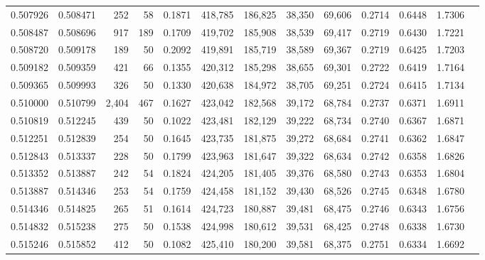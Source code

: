 \begin{tabular}{rrrrrrrrrrrrr}
0.507926 & 0.508471 &   252 &  58 &                                     0.1871 & 418,785 & 186,825 &  38,350 &  69,606 & 0.2714 & 0.6448 & 1.7306 \\
0.508487 & 0.508696 &   917 & 189 &                                     0.1709 & 419,702 & 185,908 &  38,539 &  69,417 & 0.2719 & 0.6430 & 1.7221 \\
0.508720 & 0.509178 &   189 &  50 &                                     0.2092 & 419,891 & 185,719 &  38,589 &  69,367 & 0.2719 & 0.6425 & 1.7203 \\
0.509182 & 0.509359 &   421 &  66 &                                     0.1355 & 420,312 & 185,298 &  38,655 &  69,301 & 0.2722 & 0.6419 & 1.7164 \\
0.509365 & 0.509993 &   326 &  50 &                                     0.1330 & 420,638 & 184,972 &  38,705 &  69,251 & 0.2724 & 0.6415 & 1.7134 \\
0.510000 & 0.510799 & 2,404 & 467 &                                     0.1627 & 423,042 & 182,568 &  39,172 &  68,784 & 0.2737 & 0.6371 & 1.6911 \\
0.510819 & 0.512245 &   439 &  50 &                                     0.1022 & 423,481 & 182,129 &  39,222 &  68,734 & 0.2740 & 0.6367 & 1.6871 \\
0.512251 & 0.512839 &   254 &  50 &                                     0.1645 & 423,735 & 181,875 &  39,272 &  68,684 & 0.2741 & 0.6362 & 1.6847 \\
0.512843 & 0.513337 &   228 &  50 &                                     0.1799 & 423,963 & 181,647 &  39,322 &  68,634 & 0.2742 & 0.6358 & 1.6826 \\
0.513352 & 0.513887 &   242 &  54 &                                     0.1824 & 424,205 & 181,405 &  39,376 &  68,580 & 0.2743 & 0.6353 & 1.6804 \\
0.513887 & 0.514346 &   253 &  54 &                                     0.1759 & 424,458 & 181,152 &  39,430 &  68,526 & 0.2745 & 0.6348 & 1.6780 \\
0.514346 & 0.514825 &   265 &  51 &                                     0.1614 & 424,723 & 180,887 &  39,481 &  68,475 & 0.2746 & 0.6343 & 1.6756 \\
0.514832 & 0.515238 &   275 &  50 &                                     0.1538 & 424,998 & 180,612 &  39,531 &  68,425 & 0.2748 & 0.6338 & 1.6730 \\
0.515246 & 0.515852 &   412 &  50 &                                     0.1082 & 425,410 & 180,200 &  39,581 &  68,375 & 0.2751 & 0.6334 & 1.6692 \\

\end{tabular}
